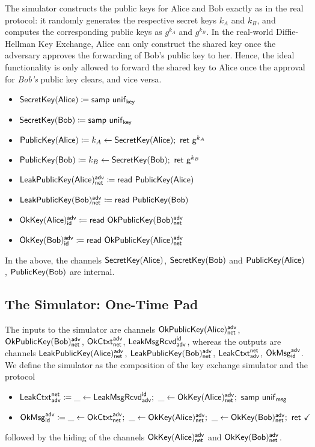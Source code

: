 The simulator constructs the public keys for Alice and Bob exactly as in the real protocol: it randomly generates the respective secret keys $k_A$ and $k_B$, and computes the corresponding public keys as $g^{k_A}$ and $g^{k_B}$. In the real-world Diffie-Hellman Key Exchange, Alice can only construct the shared key once the adversary approves the forwarding of Bob's public key to her. Hence, the ideal functionality is only allowed to forward the shared key to Alice once the approval for \emph{Bob's} public key clears, and vice versa.

\begin{itemize}
\item $\mathsf{SecretKey}(\mathsf{Alice}) \coloneqq \mathsf{samp} \ \mathsf{unif}_{\mathsf{key}}$
\item $\mathsf{SecretKey}(\mathsf{Bob}) \coloneqq \mathsf{samp} \ \mathsf{unif}_{\mathsf{key}}$
\item $\mathsf{PublicKey}(\mathsf{Alice}) \coloneqq k_A \leftarrow \mathsf{SecretKey}(\mathsf{Alice}); \ \mathsf{ret} \ \mathsf{g}^{k_A}$
\item $\mathsf{PublicKey}(\mathsf{Bob}) \coloneqq k_B \leftarrow \mathsf{SecretKey}(\mathsf{Bob}); \ \mathsf{ret} \ \mathsf{g}^{k_B}$
\item $\mathsf{LeakPublicKey}(\mathsf{Alice})^{\mathsf{adv}}_{\mathsf{net}} \coloneqq \mathsf{read} \ \mathsf{PublicKey}(\mathsf{Alice})$
\item $\mathsf{LeakPublicKey}(\mathsf{Bob})^{\mathsf{adv}}_{\mathsf{net}} \coloneqq \mathsf{read} \ \mathsf{PublicKey}(\mathsf{Bob})$
\item $\mathsf{OkKey}(\mathsf{Alice})^{\mathsf{adv}}_{\mathsf{id}} \coloneqq \mathsf{read} \ \mathsf{OkPublicKey}(\mathsf{Bob})^{\mathsf{adv}}_{\mathsf{net}}$
\item $\mathsf{OkKey}(\mathsf{Bob})^{\mathsf{adv}}_{\mathsf{id}} \coloneqq \mathsf{read} \ \mathsf{OkPublicKey}(\mathsf{Alice})^{\mathsf{adv}}_{\mathsf{net}}$
\end{itemize}
In the above, the channels $\mathsf{SecretKey}(\mathsf{Alice})$, $\mathsf{SecretKey}(\mathsf{Bob})$ and $\mathsf{PublicKey}(\mathsf{Alice})$, $\mathsf{PublicKey}(\mathsf{Bob})$ are internal.

\subsection{The Simulator: One-Time Pad}
The inputs to the simulator are channels $\mathsf{OkPublicKey}(\mathsf{Alice})^{\mathsf{adv}}_{\mathsf{net}}$, $\mathsf{OkPublicKey}(\mathsf{Bob})^{\mathsf{adv}}_{\mathsf{net}}$, $\mathsf{OkCtxt}^{\mathsf{adv}}_{\mathsf{net}}$, $\mathsf{LeakMsgRcvd}^{\mathsf{id}}_{\mathsf{adv}}$, whereas the outputs are channels $\mathsf{LeakPublicKey}(\mathsf{Alice})^{\mathsf{adv}}_{\mathsf{net}}$, $\mathsf{LeakPublicKey}(\mathsf{Bob})^{\mathsf{adv}}_{\mathsf{net}}$, $\mathsf{LeakCtxt}^{\mathsf{net}}_{\mathsf{adv}}$, $\mathsf{OkMsg}^{\mathsf{adv}}_{\mathsf{id}}$. We define the simulator as the composition of the key exchange simulator and the protocol
\begin{itemize}
\item $\mathsf{LeakCtxt}^{\mathsf{net}}_{\mathsf{adv}} \coloneqq \_ \leftarrow \mathsf{LeakMsgRcvd}^{\mathsf{id}}_{\mathsf{adv}}; \ \_ \leftarrow \mathsf{OkKey}(\mathsf{Alice})^{\mathsf{adv}}_{\mathsf{net}}; \ \mathsf{samp} \ \mathsf{unif}_{\mathsf{msg}}$
\item $\OkMsg^\adv_\id \coloneqq \_ \leftarrow \OkCtxt^\adv_\net; \ \_ \leftarrow \OkKey(\Alice)^\adv_\net; \ \_ \leftarrow \OkKey(\Bob)^\adv_\net; \ \ret{\checkmark}$
\end{itemize}
followed by the hiding of the channels $\mathsf{OkKey}(\mathsf{Alice})^{\mathsf{adv}}_{\mathsf{net}}$ and $\mathsf{OkKey}(\mathsf{Bob})^{\mathsf{adv}}_{\mathsf{net}}$.

